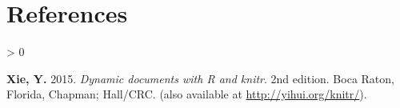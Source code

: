 \documentclass[
  10pt,
  b5paper,
  oneside]{book}
\newlength{\cslhangindent}
\newenvironment{CSLReferences}[2] %
 {%
  \setlength{\parindent}{0pt}
  \ifodd #1 \everypar{\setlength{\hangindent}{\cslhangindent}}\ignorespaces\fi
  \ifnum #2 > 0
  \setlength{\parskip}{#2\baselineskip}
  \fi
 }%
 {}
\theoremstyle{definition}
\theoremstyle{definition}
\theoremstyle{definition}
\theoremstyle{definition}
\theoremstyle{remark}
\begin{document}
\hypertarget{references}{%
\chapter*{References}\label{references}}

\hypertarget{refs}{}
\begin{CSLReferences}{0}{0}
\leavevmode\hypertarget{ref-xie2015}{}%
\textbf{Xie, Y.} 2015. \emph{Dynamic documents with {R} and knitr}. 2nd edition. Boca Raton, Florida, Chapman; Hall/CRC. (also available at \url{http://yihui.org/knitr/}).

\end{CSLReferences}


\end{document}

